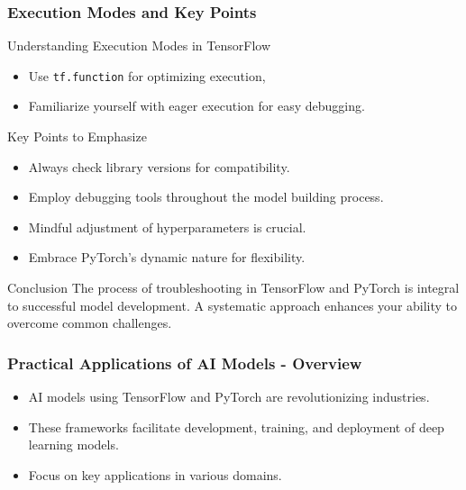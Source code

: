 \documentclass[aspectratio=169]{beamer}
\begin{document}
\begin{frame}[fragile]
    \frametitle{Execution Modes and Key Points}
    \begin{block}{Understanding Execution Modes in TensorFlow}
        \begin{itemize}
            \item Use \texttt{tf.function} for optimizing execution,
            \item Familiarize yourself with eager execution for easy debugging.
        \end{itemize}
    \end{block}
    
    \begin{block}{Key Points to Emphasize}
        \begin{itemize}
            \item Always check library versions for compatibility.
            \item Employ debugging tools throughout the model building process.
            \item Mindful adjustment of hyperparameters is crucial.
            \item Embrace PyTorch's dynamic nature for flexibility.
        \end{itemize}
    \end{block}

    \begin{block}{Conclusion}
        The process of troubleshooting in TensorFlow and PyTorch is integral to successful model development. A systematic approach enhances your ability to overcome common challenges.
    \end{block}
\end{frame}

\begin{frame}[fragile]
    \frametitle{Practical Applications of AI Models - Overview}
    \begin{itemize}
        \item AI models using TensorFlow and PyTorch are revolutionizing industries.
        \item These frameworks facilitate development, training, and deployment of deep learning models.
        \item Focus on key applications in various domains.
    \end{itemize}
\end{frame}
\end{document}
